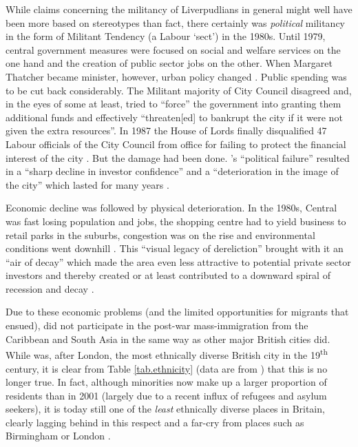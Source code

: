 While claims concerning the militancy of Liverpudlians in general might well have been more based on stereotypes than fact, there certainly was \emph{political} militancy in the form of Militant Tendency (a Labour `sect') in the 1980s.
Until 1979, central government measures were focused on social and welfare services on the one hand and the creation of public sector jobs on the other. When Margaret Thatcher became  minister, however, urban policy changed \citep[cf.][19]{juddparkinson1990a}.
Public spending was to be cut back considerably.
The Militant majority of  City Council disagreed and, in the eyes of some at least, tried to \enquote{force} the government into granting them additional funds and effectively ``threaten[ed] to bankrupt the city if it were not given the extra resources''.
In 1987 the House of Lords finally disqualified 47 Labour officials of the City Council from office for failing to protect the financial interest of the city \citep[cf.][249--250]{parkinson1990}.
But the damage had been done.
's ``political failure'' \citep[241]{parkinson1990} resulted in a ``sharp decline in investor confidence'' and a ``deterioration in the image of the city'' which lasted for many years \citep[172]{couch2003a}.

Economic decline was followed by physical deterioration.
In the 1980s, Central  was fast losing population and jobs, the shopping centre had to yield business to retail parks in the suburbs, congestion was on the rise and environmental conditions went downhill \citep[cf.][38]{couch2003}.
This ``visual legacy of dereliction'' brought with it an ``air of decay'' which made the area even less attractive to potential private sector investors and thereby created or at least contributed to a downward spiral of recession and decay \citep[21]{fraser2003}.

Due to these economic problems (and the limited opportunities for migrants that ensued),  did not participate in the post-war mass-immigration from the Caribbean and South Asia in the same way as other major British cities did.
While  was, after London, the most ethnically diverse British city in the 19\textsuperscript{th} century, it is clear from Table \ref{tab.ethnicity} (data are from \citealt{nomis}) that this is no longer true.
In fact, although minorities now make up a larger proportion of  residents than in 2001 (largely due to a recent influx of refugees and asylum seekers), it is today still one of the \emph{least} ethnically diverse places in Britain, clearly lagging behind  in this respect and a far-cry from places such as Birmingham or London \citep[cf.][187]{pooley2006}.

